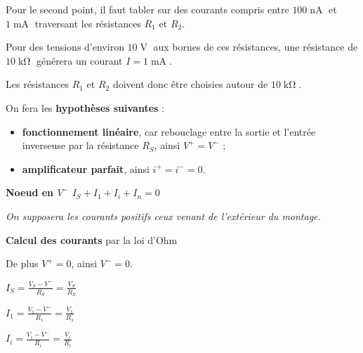 \documentclass[a4paper,french]{paper}
\begin{document}
Pour le second point, il faut tabler sur des courants compris entre $100\operatorname{nA}$ et $1\operatorname{mA}$ traversant les résistances $R_1$ et $R_2$.

Pour des tensions d'environ $10\operatorname{V}$ aux bornes de ces résistances, une résistance de $10\operatorname{k\Omega}$ générera un courant $I = 1\operatorname{mA}$.

Les résistances $R_1$ et $R_2$ doivent donc être choisies autour de $10\operatorname{k\Omega}$.

\newpage

On fera les \textbf{hypothèses suivantes} :
\begin{itemize}
	\item \textbf{fonctionnement linéaire}, car rebouclage entre la sortie et l'entrée inverseuse par la résistance $R_S$, ainsi $V^+ = V^-$ ;
	\item \textbf{amplificateur parfait}, ainsi $i^+ = i^- = 0$. 
\end{itemize}

\medskip

\textbf{Noeud en $V^-$} $I_S + I_1 + I_i + I_n = 0$

\textit{On supposera les courants positifs ceux venant de l'extérieur du montage.}

\medskip

\textbf{Calcul des courants} par la loi d'Ohm

De plus $V^+ = 0$, ainsi $V^- = 0$.

$I_S = \frac{V_S - V^-}{R_S} = \frac{V_S}{R_S}$

$I_1 = \frac{V_1 - V^-}{R_1} = \frac{V_1}{R_1}$

$I_i = \frac{V_i - V^-}{R_i} = \frac{V_i}{R_i}$
\end{document}
